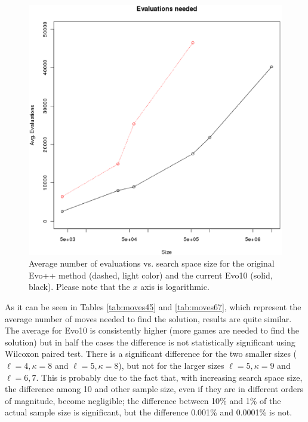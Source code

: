 \documentclass[conference]{IEEEtran}
\begin{document}
\begin{figure}[!htb]
\centering
\includegraphics[scale=0.50]{size.eps}
\caption{Average number of evaluations 
  vs. search space size for the original Evo++ method (dashed, light
  color) and the current Evo10 (solid, black).  Please note that the
  $x$ axis is logarithmic. \label{fig:size}}
\end{figure} 
%

As it can be seen in Tables \ref{tab:moves45} and \ref{tab:moves67},
which represent the average number of moves needed to find the
solution, results are quite similar. The average for Evo10 is
consistently higher (more games are needed to find the solution)
but in half the cases the difference is not statistically
significant using Wilcoxon paired test. 
There is a significant
difference for the two smaller sizes ($\ell=4,\kappa=8$ and
$\ell=5,\kappa=8$), but not for the larger sizes  $\ell=5,\kappa=9$
and $\ell=6,7$. This is probably due to the fact that, with increasing
search space size, the difference among 10 and other sample size, even
if they are in different orders of magnitude, become negligible; the
difference between 10\% and 1\% of the actual sample size is
significant, but the difference 0.001\% and 0.0001\% is not. 
\end{document}
